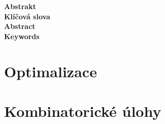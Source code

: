 \documentclass[a4paper,oneside,12pt]{book}
\theoremstyle{definition}
\theoremstyle{plain}
\theoremstyle{remark}
\begin{document}
\newpage
\thispagestyle{empty}
{\Large
\noindent\textbf{Abstrakt}}\\[3pt]


\vfill
{\Large
\noindent\textbf{Klíčová slova}}\\[3pt]


\newpage
\thispagestyle{empty}
{\Large
\noindent\textbf{Abstract}}\\[3pt]


\vfill
{\Large
\noindent\textbf{Keywords}}\\[3pt]



\setcounter{page}{0}
\tableofcontents

{
  \pagestyle{plain}
  
  \clearpage
  
  \clearpage
}


\part{Optimalizace}


\clearpage


\clearpage


\clearpage


\clearpage


\part{Kombinatorické úlohy}


\clearpage


\clearpage


\clearpage




\end{document}
